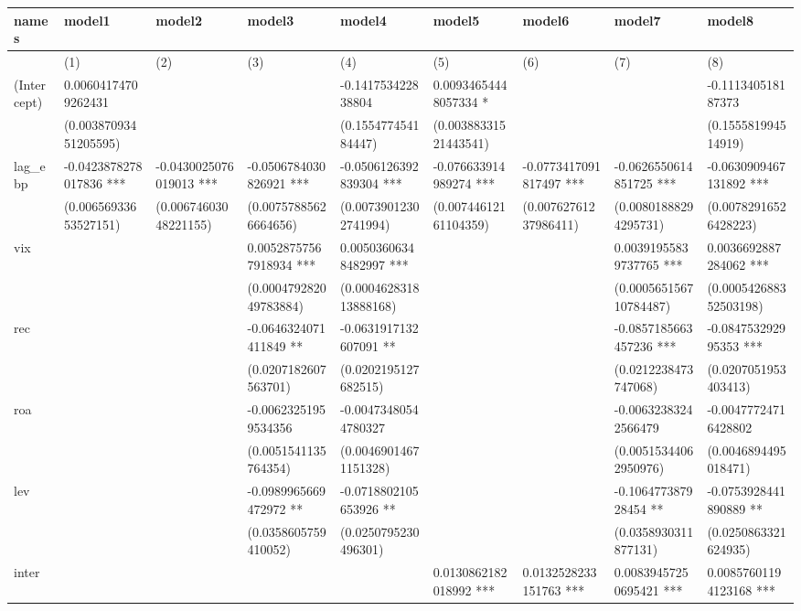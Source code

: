 \begin{table}[ht]
\centering
\begin{tabular}{lllllllll}
  \hline
names & model1 & model2 & model3 & model4 & model5 & model6 & model7 & model8 \\ 
  \hline
 & (1) & (2) & (3) & (4) & (5) & (6) & (7) & (8) \\ 
  (Intercept) & 0.00604174709262431 &  &  & -0.141753422838804 & 0.00934654448057334 * &  &  & -0.111340518187373 \\ 
   & (0.00387093451205595) &  &  & (0.155477454184447) & (0.00388331521443541) &  &  & (0.155581994514919) \\ 
  lag\_ebp & -0.0423878278017836 *** & -0.0430025076019013 *** & -0.0506784030826921 *** & -0.0506126392839304 *** & -0.076633914989274 *** & -0.0773417091817497 *** & -0.0626550614851725 *** & -0.0630909467131892 *** \\ 
   & (0.00656933653527151) & (0.00674603048221155) & (0.00757885626664656) & (0.00739012302741994) & (0.00744612161104359) & (0.00762761237986411) & (0.00801888294295731) & (0.00782916526428223) \\ 
  vix &  &  & 0.00528757567918934 *** & 0.00503606348482997 *** &  &  & 0.00391955839737765 *** & 0.0036692887284062 *** \\ 
   &  &  & (0.000479282049783884) & (0.000462831813888168) &  &  & (0.000565156710784487) & (0.000542688352503198) \\ 
  rec &  &  & -0.0646324071411849 ** & -0.0631917132607091 ** &  &  & -0.0857185663457236 *** & -0.084753292995353 *** \\ 
   &  &  & (0.0207182607563701) & (0.0202195127682515) &  &  & (0.0212238473747068) & (0.0207051953403413) \\ 
  roa &  &  & -0.00623251959534356 & -0.00473480544780327 &  &  & -0.00632383242566479 & -0.00477724716428802 \\ 
   &  &  & (0.0051541135764354) & (0.00469014671151328) &  &  & (0.00515344062950976) & (0.0046894495018471) \\ 
  lev &  &  & -0.0989965669472972 ** & -0.0718802105653926 ** &  &  & -0.106477387928454 ** & -0.0753928441890889 ** \\ 
   &  &  & (0.0358605759410052) & (0.0250795230496301) &  &  & (0.0358930311877131) & (0.0250863321624935) \\ 
  inter &  &  &  &  & 0.0130862182018992 *** & 0.0132528233151763 *** & 0.00839457250695421 *** & 0.00857601194123168 *** \\ 

\end{tabular}
\end{table}
